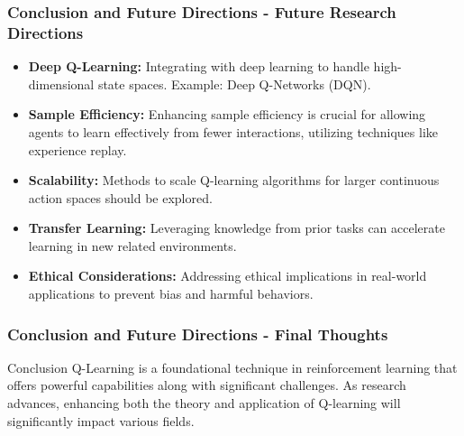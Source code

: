 \documentclass{beamer}
\begin{document}
\begin{frame}[fragile]
    \frametitle{Conclusion and Future Directions - Future Research Directions}
    \begin{itemize}
        \item \textbf{Deep Q-Learning:} 
        Integrating with deep learning to handle high-dimensional state spaces. Example: Deep Q-Networks (DQN).
        
        \item \textbf{Sample Efficiency:} 
        Enhancing sample efficiency is crucial for allowing agents to learn effectively from fewer interactions, utilizing techniques like experience replay.
        
        \item \textbf{Scalability:} 
        Methods to scale Q-learning algorithms for larger continuous action spaces should be explored.
        
        \item \textbf{Transfer Learning:} 
        Leveraging knowledge from prior tasks can accelerate learning in new related environments.
        
        \item \textbf{Ethical Considerations:} 
        Addressing ethical implications in real-world applications to prevent bias and harmful behaviors.
    \end{itemize}
\end{frame}

\begin{frame}[fragile]
    \frametitle{Conclusion and Future Directions - Final Thoughts}
    \begin{block}{Conclusion}
        Q-Learning is a foundational technique in reinforcement learning that offers powerful capabilities along with significant challenges. 
        As research advances, enhancing both the theory and application of Q-learning will significantly impact various fields.
    \end{block}
\end{frame}
\end{document}
